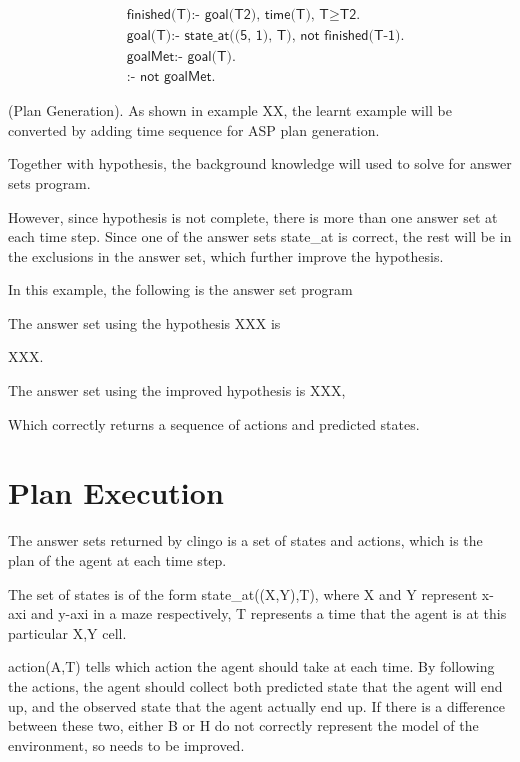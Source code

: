 \begin{equation}
\begin{split}
&\textsf{finished(T):- goal(T2), time(T), T} \geq \textsf{T2.}\\
&\textsf{goal(T):- state\_at((5, 1), T), not finished(T-1).}\\
&\textsf{goalMet:- goal(T).}\\
&\textsf{:- not goalMet.}
\end{split}
\end{equation}

\begin{examp} \normalfont (Plan Generation).
As shown in example XX, the learnt example will be converted by adding time sequence for ASP plan generation.

Together with hypothesis, the background knowledge will used to solve for answer sets program. 

However, since hypothesis is not complete, there is more than one answer set at each time step. Since one of the answer sets state\_at is correct, the rest will be in the exclusions in the answer set, 
which further improve the hypothesis.


In this example, the following is the answer set program

The answer set using the hypothesis XXX is 

XXX. 

The answer set using the improved hypothesis is XXX, 

Which correctly returns a sequence of actions and predicted states. 

\end{examp}

\section{Plan Execution}
\label{Plan execution}

The answer sets returned by clingo is a set of states and actions, which is the plan of the agent at each time step.

The set of states is of the form state\_at((X,Y),T), where X and Y represent x-axi and y-axi in a maze respectively, T represents a time that the agent is at
this particular X,Y cell.

action(A,T) tells which action the agent should take at each time. By following the actions, the agent should collect both predicted state that the
agent will end up, and the observed state that the agent actually end up. If there is a difference between these two, either B or H do not correctly represent
the model of the environment, so needs to be improved.

